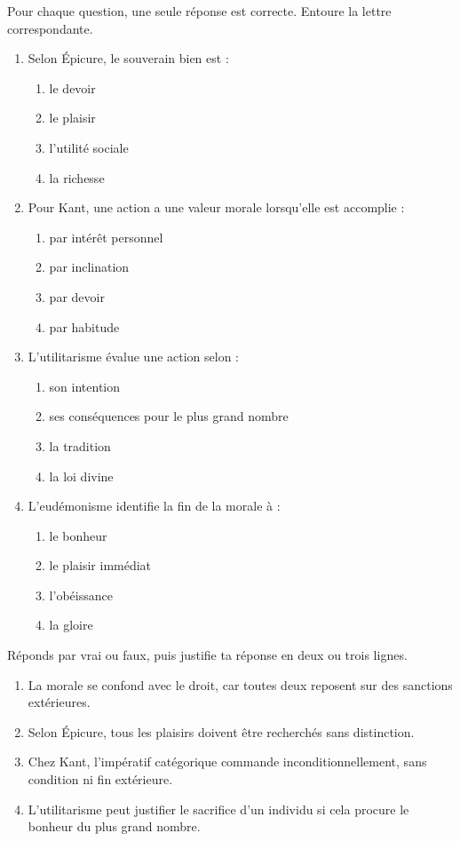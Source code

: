\documentclass[11pt]{article}
\begin{document}
\begin{exercice}
Pour chaque question, une seule réponse est correcte. Entoure la lettre correspondante.
\begin{enumerate}
\item Selon Épicure, le souverain bien est :
\begin{enumerate}
\item[a)] le devoir \item[b)] le plaisir \item[c)] l'utilité sociale \item[d)] la richesse
\end{enumerate}
\item Pour Kant, une action a une valeur morale lorsqu'elle est accomplie :
\begin{enumerate}
\item[a)] par intérêt personnel \item[b)] par inclination \item[c)] par devoir \item[d)] par habitude
\end{enumerate}
\item L'utilitarisme évalue une action selon :
\begin{enumerate}
\item[a)] son intention \item[b)] ses conséquences pour le plus grand nombre \item[c)] la tradition \item[d)] la loi divine
\end{enumerate}
\item L'eudémonisme identifie la fin de la morale à :
\begin{enumerate}
\item[a)] le bonheur \item[b)] le plaisir immédiat \item[c)] l'obéissance \item[d)] la gloire
\end{enumerate}
\end{enumerate}
\end{exercice}

\begin{exercice}
Réponds par vrai ou faux, puis justifie ta réponse en deux ou trois lignes.
\begin{enumerate}
\item La morale se confond avec le droit, car toutes deux reposent sur des sanctions extérieures.
\item Selon Épicure, tous les plaisirs doivent être recherchés sans distinction.
\item Chez Kant, l'impératif catégorique commande inconditionnellement, sans condition ni fin extérieure.
\item L'utilitarisme peut justifier le sacrifice d'un individu si cela procure le bonheur du plus grand nombre.
\end{enumerate}
\end{exercice}
\end{document}
